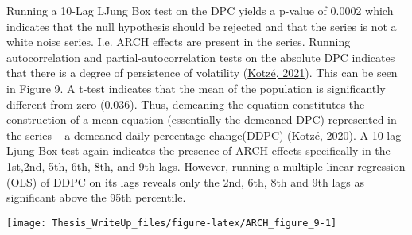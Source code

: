 \documentclass[11pt,preprint, authoryear]{elsarticle}
\let\origfigure\figure
\let\endorigfigure\endfigure
\renewenvironment{figure}[1][2] {
    \expandafter\origfigure\expandafter[H]
} {
    \endorigfigure
}
\numberwithin{equation}{section}
\numberwithin{figure}{section}
\numberwithin{table}{section}
\begin{document}
Running a 10-Lag LJung Box test on the DPC yields a p-value of 0.0002
which indicates that the null hypothesis should be rejected and that the
series is not a white noise series. I.e. ARCH effects are present in the
series. Running autocorrelation and partial-autocorrelation tests on the
absolute DPC indicates that there is a degree of persistence of
volatility (\protect\hyperlink{ref-kotze2021volatility}{Kotzé, 2021}).
This can be seen in Figure 9. A t-test indicates that the mean of the
population is significantly different from zero (0.036). Thus, demeaning
the equation constitutes the construction of a mean equation
(essentially the demeaned DPC) represented in the series -- a demeaned
daily percentage change(DDPC)
(\protect\hyperlink{ref-kotze2020univariate}{Kotzé, 2020}). A 10 lag
Ljung-Box test again indicates the presence of ARCH effects specifically
in the 1st,2nd, 5th, 6th, 8th, and 9th lags. However, running a multiple
linear regression (OLS) of DDPC on its lags reveals only the 2nd, 6th,
8th and 9th lags as significant above the 95th percentile.

\begin{figure}[H]

{\centering \texttt{[image: Thesis\_WriteUp\_files/figure-latex/ARCH\_figure\_9-1]} 

}

\caption{Autocorrelation and partial-autocorrelation functions of absolute LogDiff \label{Figure9}}\label{fig:ARCH_figure_9}
\end{figure}
\end{document}
